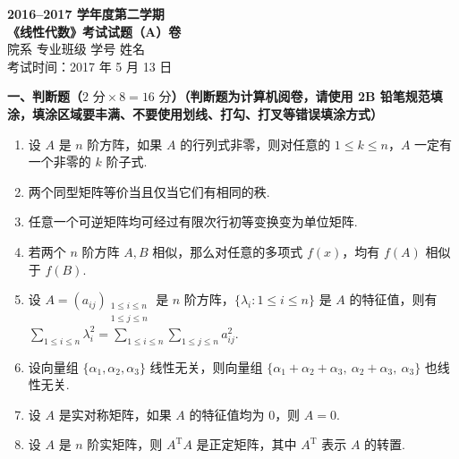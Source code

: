 \documentclass[a4paper,11pt]{ctexart}
\newcommand{\T}{\mathrm{T}}
\begin{document}
\begin{center}
  {\Large\bfseries 2016--2017 学年度第二学期}\\[0.4em]
  {\Large\bfseries 《线性代数》考试试题（A）卷}\\[1.0em]
  {\normalsize
    院系\underline{\hspace{2.5cm}}\quad
    专业班级\underline{\hspace{2.8cm}}\quad
    学号\underline{\hspace{2.8cm}}\quad
    姓名\underline{\hspace{2.5cm}}
  }\\[0.5em]
  {\normalsize \hfill 考试时间：2017 年 5 月 13 日}
\end{center}

\vspace{0.6em}

\textbf{一、判断题（$2\text{ 分}\times 8 = 16\text{ 分}$）（判断题为计算机阅卷，请使用 2B 铅笔规范填涂，填涂区域要丰满、不要使用划线、打勾、打叉等错误填涂方式）}

\begin{enumerate}[label=\arabic*., leftmargin=2em, itemsep=0.6em, topsep=0.5em]
  \item 设 $A$ 是 $n$ 阶方阵，如果 $A$ 的行列式非零，则对任意的 $1 \leqslant k \leqslant n$，$A$ 一定有一个非零的 $k$ 阶子式.

  \item 两个同型矩阵等价当且仅当它们有相同的秩.

  \item 任意一个可逆矩阵均可经过有限次行初等变换变为单位矩阵.

  \item 若两个 $n$ 阶方阵 $A, B$ 相似，那么对任意的多项式 $f(x)$，均有 $f(A)$ 相似于 $f(B)$.

  \item 设 $A = (a_{ij})_{\substack{1 \leqslant i \leqslant n \\ 1 \leqslant j \leqslant n}}$ 是 $n$ 阶方阵，$\{\lambda_i : 1 \leqslant i \leqslant n\}$ 是 $A$ 的特征值，则有 $\displaystyle \sum_{1 \leqslant i \leqslant n} \lambda_i^2 = \sum_{1 \leqslant i \leqslant n} \sum_{1 \leqslant j \leqslant n} a_{ij}^2$.

  \item 设向量组 $\{\alpha_1, \alpha_2, \alpha_3\}$ 线性无关，则向量组 $\{\alpha_1 + \alpha_2 + \alpha_3,\ \alpha_2 + \alpha_3,\ \alpha_3\}$ 也线性无关.

  \item 设 $A$ 是实对称矩阵，如果 $A$ 的特征值均为 $0$，则 $A = 0$.

  \item 设 $A$ 是 $n$ 阶实矩阵，则 $A^{\T} A$ 是正定矩阵，其中 $A^{\T}$ 表示 $A$ 的转置.
\end{enumerate}
\end{document}
